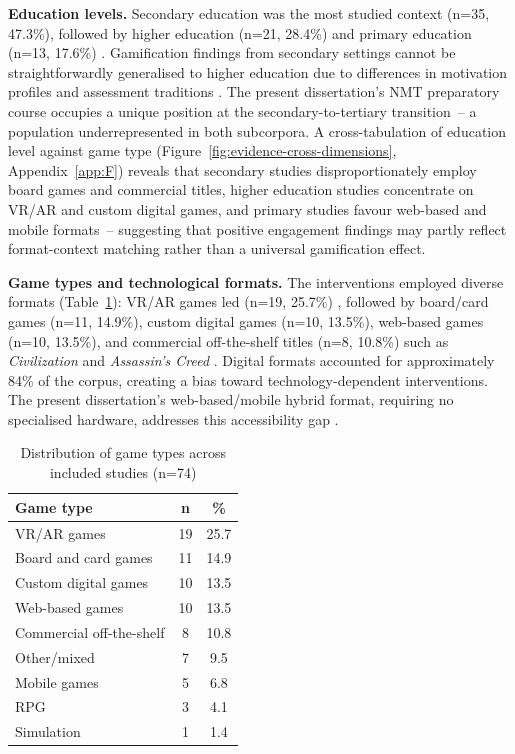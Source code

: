 \textbf{Education levels.}
Secondary education was the most studied context (n=35, 47.3\%), followed by higher education (n=21, 28.4\%) and primary education (n=13, 17.6\%) \cite{49Huizenga2007127, 11Ternblad2023115, 15Slater2022}. Gamification findings from secondary settings cannot be straightforwardly generalised to higher education due to differences in motivation profiles and assessment traditions \cite{Ahlfeld2021493}. The present dissertation's NMT preparatory course occupies a unique position at the secondary-to-tertiary transition~-- a population underrepresented in both subcorpora. A cross-tabulation of education level against game type (Figure~\ref{fig:evidence-cross-dimensions}, Appendix~\ref{app:F}) reveals that secondary studies disproportionately employ board games and commercial titles, higher education studies concentrate on VR/AR and custom digital games, and primary studies favour web-based and mobile formats~-- suggesting that positive engagement findings may partly reflect format-context matching rather than a universal gamification effect.

\textbf{Game types and technological formats.}
The interventions employed diverse formats (Table~\ref{tab:game-types}): VR/AR games led (n=19, 25.7\%) \cite{1Barbatsis201159, 10Huaman2019220, 6Czerwinski2018}, followed by board/card games (n=11, 14.9\%), custom digital games (n=10, 13.5\%), web-based games (n=10, 13.5\%), and commercial off-the-shelf titles (n=8, 10.8\%) such as \textit{Civilization} \cite{55Squire2004} and \textit{Assassin's Creed} \cite{12Gilbert2019108}. Digital formats accounted for approximately 84\% of the corpus, creating a bias toward technology-dependent interventions. The present dissertation's web-based/mobile hybrid format, requiring no specialised hardware, addresses this accessibility gap \cite{KorniienkoSemerikov2024}.

\begin{table}[!h]
\centering
\caption{Distribution of game types across included studies (n=74)}
\label{tab:game-types}
\small
\begin{tabular}{lcc}
\hline
\textbf{Game type} & \textbf{n} & \textbf{\%} \\
\hline
VR/AR games & 19 & 25.7 \\
Board and card games & 11 & 14.9 \\
Custom digital games & 10 & 13.5 \\
Web-based games & 10 & 13.5 \\
Commercial off-the-shelf & 8 & 10.8 \\
Other/mixed & 7 & 9.5 \\
Mobile games & 5 & 6.8 \\
RPG & 3 & 4.1 \\
Simulation & 1 & 1.4 \\
\hline
\end{tabular}
\end{table}

